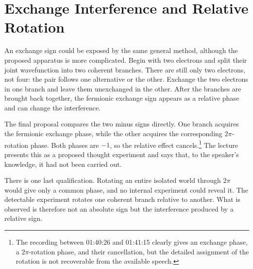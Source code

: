 \begin{classroomqa}
\end{classroomqa}

\begin{classroomqa}
\end{classroomqa}

\section{Exchange Interference and Relative Rotation}

An exchange sign could be exposed by the same general method, although the proposed apparatus is more complicated. Begin with two electrons and split their joint wavefunction into two coherent branches. There are still only two electrons, not four: the pair follows one alternative or the other. Exchange the two electrons in one branch and leave them unexchanged in the other. After the branches are brought back together, the fermionic exchange sign appears as a relative phase and can change the interference.

The final proposal compares the two minus signs directly. One branch acquires the fermionic exchange phase, while the other acquires the corresponding \(2\pi\)-rotation phase. Both phases are \(-1\), so the relative effect cancels.\footnote{The recording between 01:40:26 and 01:41:15 clearly gives an exchange phase, a \(2\pi\)-rotation phase, and their cancellation, but the detailed assignment of the rotation is not recoverable from the available speech.} The lecture presents this as a proposed thought experiment and says that, to the speaker's knowledge, it had not been carried out.

\begin{classroomqa}
\end{classroomqa}

There is one last qualification. Rotating an entire isolated world through \(2\pi\) would give only a common phase, and no internal experiment could reveal it. The detectable experiment rotates one coherent branch relative to another. What is observed is therefore not an absolute sign but the interference produced by a relative sign.
